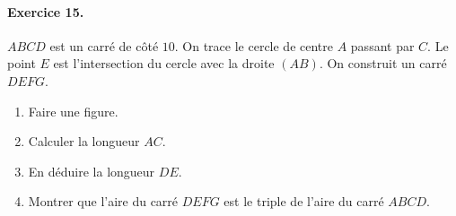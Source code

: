 \documentclass[11pt]{article}
\begin{document}
\paragraph{Exercice 15.} $ABCD$ est un carré de côté $10$. On trace le cercle de
centre $A$ passant par $C$. Le point $E$ est l'intersection du cercle avec la
droite $(AB)$. On construit un carré $DEFG$.
\begin{enumerate}
  \item Faire une figure.
  \item Calculer la longueur $AC$.
  \item En déduire la longueur $DE$.
  \item Montrer que l'aire du carré $DEFG$ est le triple de l'aire du carré
    $ABCD$.
\end{enumerate}
\end{document}
